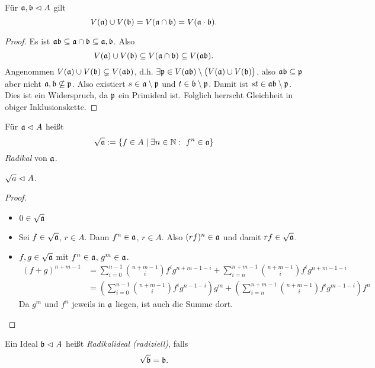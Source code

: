 \begin{lemma}
	\label{lemma:vereinigungen von v sind produkt}
	Für $\mathfrak{a}, \mathfrak b\vartriangleleft A$ gilt
	\[
		V(\mathfrak{a}) \cup V(\mathfrak b) = V(\mathfrak{a} \cap \mathfrak b) = V(\mathfrak{a} \cdot \mathfrak b).
	\]
\end{lemma}
\begin{proof}
	Es ist 
	$\mathfrak{a}\mathfrak b \subseteq \mathfrak{a} \cap \mathfrak b \subseteq \mathfrak{a}, \mathfrak b$.
	Also 
	\[V(\mathfrak{a}) \cup V(\mathfrak b) \subseteq V(\mathfrak{a} \cap \mathfrak b) 
	\subseteq V(\mathfrak{a}\mathfrak b).\]
	Angenommen $V(\mathfrak{a}) \cup V(\mathfrak b) \subsetneq V(\mathfrak{a}\mathfrak b)$, 
	d.h. $\exists \mathfrak{p} \in V(\mathfrak{a} \mathfrak b) \setminus \big(V(\mathfrak{a}) \cup V(\mathfrak b)\big)$,
	also $\mathfrak{a}\mathfrak b \subseteq \mathfrak{p}$ aber nicht
	$\mathfrak{a},\mathfrak b \not \subseteq \mathfrak{p}$.
	Also existiert $s \in \mathfrak{a} \setminus \mathfrak{p}$ und $t\in\mathfrak b\setminus \mathfrak{p}$.
	Damit ist $st \in \mathfrak{a}\mathfrak b \setminus \mathfrak{p}$.
	Dies ist ein Widerspruch, da $\mathfrak{p}$ ein Primideal ist.
	Folglich herrscht Gleichheit in obiger Inklusionskette.
\end{proof}

\begin{definition}[Radikal]
	Für $\mathfrak{a} \vartriangleleft A$ heißt
	\[
		\sqrt \a := \{ f\in A \mid \exists n \in \N:\ f^n\in \a\}
	\]
	\emph{Radikal} von $\mathfrak{a}$.
\end{definition}

\begin{lemma}
	\label{lemma:radikal ist ideal}
	$\sqrt a \vartriangleleft A$.
\end{lemma}
\begin{proof}
	\begin{itemize}
	  \item $0\in \sqrt{\mathfrak{a}}$ \checkmark
	  \item Sei $f \in \sqrt {\mathfrak{a}}$, $r\in A$. Dann
	  	$f^n \in \mathfrak{a}$, $r\in A$. Also 
	  	$(rf)^n \in \mathfrak{a}$ und damit $rf\in \sqrt{\mathfrak{a}}$.
	  \item $f,g\in \sqrt{\mathfrak{a}}$ mit $f^n \in \mathfrak{a}$, $g^m \in \mathfrak{a}$.
	  	\begin{align*}
	  		(f+g)^{n+m-1} &= \sum_{i=0}^{n-1} \binom{n+m-1}{i} f^i g^{n+m-1-i}
	  			+ \sum_{i=n}^{n+m-1} \binom{n+m-1}{i}
	  				f^i g^{n+m-1-i}\\
  				&= \left( \sum_{i=0}^{n-1} \binom{n+m-1}{i} 
  					f^i g^{n-1-i}\right) g^m
  					+  \left(\sum_{i=n}^{n+m-1} \binom{n+m-1}{i}
  						f^i g^{m-1-i}\right) f^n
	  	\end{align*}
	  	Da $g^m$ und $f^n$ jeweils in $\mathfrak{a}$ liegen, ist auch die Summe dort.
	\end{itemize}
\end{proof} 

\begin{definition}
	Ein Ideal $\mathfrak b \vartriangleleft A$ heißt \emph{Radikalideal (radiziell)},
	falls
	\[\sqrt \fr b = \fr b.\]
\end{definition}

